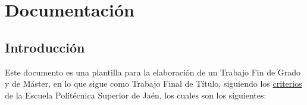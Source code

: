 
\chapter{Documentación}\label{ch:primer-capitulo}

\section{Introducción}
Este documento es una plantilla para la elaboración de un Trabajo Fin de Grado y de Máster, en lo que
sigue como Trabajo Final de Título, siguiendo los \href{https://eps.ujaen.es/sites/centro_epsj/files/uploads/documents/grados/TFG/criteriosYestilo_TFG.pdf}{criterios} de la
Escuela Politécnica Superior de Jaén, los cuales son los siguientes:

